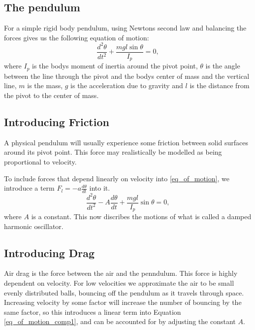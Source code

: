 \documentclass[11pt, a4paper]{article}
\begin{document}
\subsection{The pendulum}
For a simple rigid body pendulum, using Newtons second law and balancing the
forces gives us the following
equation of motion:
\begin{equation}
  \frac{d^2\theta}{dt^2} + \frac{mgl\sin{\theta}}{I_p} = 0,
  \label{eq_of_motion}
\end{equation}
where $I_p$ is the bodys moment of inertia around the pivot point, $\theta$ is the
angle between the line through the pivot and the bodys center of mass and the
vertical line, $m$ is the mass, $g$ is the acceleration due to gravity and
$l$ is the distance from the pivot to the center of mass.



\subsection{Introducing Friction}
A physical pendulum will usually experience some friction between solid
surfaces around its pivot point.
This force may realistically be modelled as being proportional to velocity\cite[p. 30]{book}.

To include forces that depend linearly on velocity into \ref{eq_of_motion}, 
we introduce a term $F_l = -a \frac{d\theta}{dt}$ into it. 
\begin{equation}
    \frac{d^2\theta}{dt^2} 
  - A \frac{d\theta}{dt}
  + \frac{mgl}{I_p}\sin{\theta} = 0,
  \label{eq_of_motion_comp1}
\end{equation}
where $A$ is a constant.
This now discribes the motions of what is called a damped harmonic oscillator\cite{osc}.

\subsection{Introducing Drag}
Air drag is the force between the air and the penndulum. 
This force is highly dependent on velocity.
For low velocities we approximate the air to be small evenly distributed balls, bouncing off the
pendulum as it travels through space. 
Increasing velocity by some factor will increase the number of bouncing by the same
factor, so this introduces a linear term into 
Equation \ref{eq_of_motion_comp1}, and can be accounted for by adjusting the constant
$A$.
\end{document}
